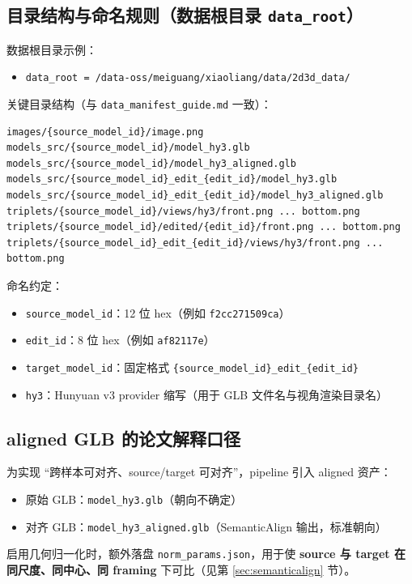 \documentclass[UTF8,a4paper,11pt]{ctexart}
\begin{document}
\subsection{目录结构与命名规则（数据根目录 \texttt{data\_root}）}
数据根目录示例：
\begin{itemize}
  \item \texttt{data\_root = /data-oss/meiguang/xiaoliang/data/2d3d\_data/}
\end{itemize}

关键目录结构（与 \texttt{data\_manifest\_guide.md} 一致）：
\begin{lstlisting}
images/{source_model_id}/image.png
models_src/{source_model_id}/model_hy3.glb
models_src/{source_model_id}/model_hy3_aligned.glb
models_src/{source_model_id}_edit_{edit_id}/model_hy3.glb
models_src/{source_model_id}_edit_{edit_id}/model_hy3_aligned.glb
triplets/{source_model_id}/views/hy3/front.png ... bottom.png
triplets/{source_model_id}/edited/{edit_id}/front.png ... bottom.png
triplets/{source_model_id}_edit_{edit_id}/views/hy3/front.png ... bottom.png
\end{lstlisting}

命名约定：
\begin{itemize}
  \item \texttt{source\_model\_id}：12 位 hex（例如 \texttt{f2cc271509ca}）
  \item \texttt{edit\_id}：8 位 hex（例如 \texttt{af82117e}）
  \item \texttt{target\_model\_id}：固定格式 \texttt{\{source\_model\_id\}\_edit\_\{edit\_id\}}
  \item \texttt{hy3}：Hunyuan v3 provider 缩写（用于 GLB 文件名与视角渲染目录名）
\end{itemize}

\subsection{aligned GLB 的论文解释口径}
为实现 ``跨样本可对齐、source/target 可对齐''，pipeline 引入 aligned 资产：
\begin{itemize}
  \item 原始 GLB：\texttt{model\_hy3.glb}（朝向不确定）
  \item 对齐 GLB：\texttt{model\_hy3\_aligned.glb}（SemanticAlign 输出，标准朝向）
\end{itemize}

启用几何归一化时，额外落盘 \texttt{norm\_params.json}，用于使 \textbf{source 与 target 在同尺度、同中心、同 framing} 下可比（见第 \ref{sec:semanticalign} 节）。
\end{document}
